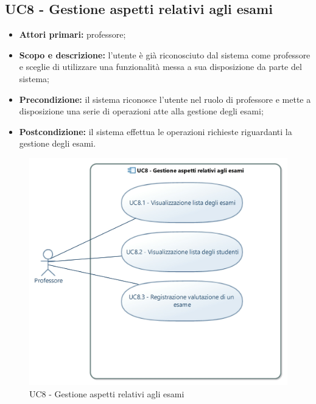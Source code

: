 \documentclass[AnalisiDeiRequisiti.tex]{subfiles}
\begin{document}
\subsection{UC8 - Gestione aspetti relativi agli esami}
\begin{itemize}
	\item \textbf{Attori primari:} professore;
	\item \textbf{Scopo e descrizione:} l'utente è già riconosciuto dal sistema come professore e sceglie di utilizzare una funzionalità messa a sua disposizione da parte del sistema;
	\item \textbf{Precondizione:} il sistema riconosce l'utente nel ruolo di professore e mette a disposizione una serie di operazioni atte alla gestione degli esami; 
	\item \textbf{Postcondizione:} il sistema effettua le operazioni richieste riguardanti la gestione degli esami.
\end{itemize}
\begin{figure}[H]
	\centering
	\includegraphics[width=0.8\linewidth]{UC8.jpg}
	\caption{UC8 - Gestione aspetti relativi agli esami}
	\label{fig:UC8 - Gestione aspetti relativi agli esami}
\end{figure}
\end{document}
